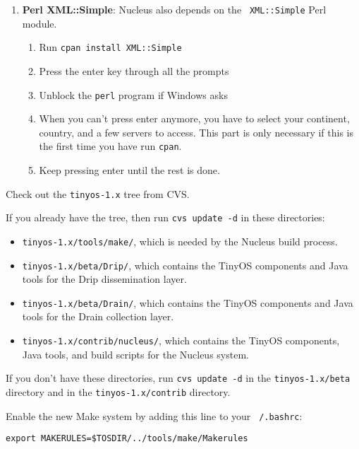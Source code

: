\documentclass{article}
\begin{document}
\begin{enumerate}
\item {\bf Perl XML::Simple}: Nucleus also depends on the {\tt
XML::Simple} Perl module. 
\begin{enumerate}
\item Run {\tt cpan install XML::Simple}
\item Press the enter key through all the prompts
\item Unblock the {\tt perl} program if Windows asks
\item When you can't press enter anymore, you have to select your
continent, country, and a few servers to access. This part is only necessary if this is the first time you have run {\tt cpan}.
\item Keep pressing enter until the rest is done.
\end{enumerate}
\end{enumerate}

Check out the {\tt tinyos-1.x} tree from CVS. 

If you already have the tree, then run {\tt cvs update -d} in these
directories:

\begin{itemize}

\item {\tt tinyos-1.x/tools/make/}, which is needed by the Nucleus
build process.

\item {\tt tinyos-1.x/beta/Drip/}, which contains the TinyOS components
and Java tools for the Drip dissemination layer.

\item {\tt tinyos-1.x/beta/Drain/}, which contains the TinyOS
components and Java tools for the Drain collection layer.

\item {\tt tinyos-1.x/contrib/nucleus/}, which contains the TinyOS
components, Java tools, and build scripts for the Nucleus system.

\end{itemize}

If you don't have these directories, run {\tt cvs update -d} in the
{\tt tinyos-1.x/beta} directory and in the {\tt tinyos-1.x/contrib}
directory.

Enable the new Make system by adding this line to your {\tt ~/.bashrc}:

\begin{verbatim}
export MAKERULES=$TOSDIR/../tools/make/Makerules
\end{verbatim}
\end{document}
